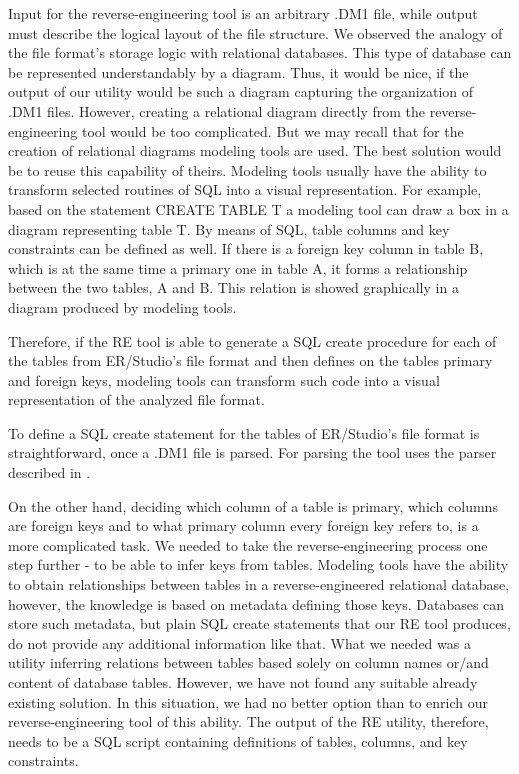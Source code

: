 Input for the reverse-engineering tool is an arbitrary .DM1 file, while output must describe the logical layout of the file structure.
We observed the analogy of the file format's storage logic with relational databases. 
This type of database can be represented understandably by a diagram.
Thus, it would be nice, if the output of our utility would be such a diagram capturing the organization of .DM1 files.
However, creating a relational diagram directly from the reverse-engineering tool would be too complicated. But we may recall that for the creation of relational diagrams modeling tools are used. The best solution would be to reuse this capability of theirs.
Modeling tools usually have the ability to transform selected routines of SQL into a visual representation.
For example, based on the statement CREATE TABLE T a modeling tool can draw a box in a diagram representing table T. 
By means of SQL, table columns and key constraints can be defined as well.
If there is a foreign key column in table B, which is at the same time a primary one in table A, it forms a relationship between the two tables, A and B. This relation is showed graphically in a diagram produced by modeling tools.

Therefore, if the RE tool is able to generate a SQL create procedure for each of the tables from ER/Studio's file format and then defines on the tables primary and foreign keys, modeling tools can transform such code into a visual representation of the analyzed file format.

To define a SQL create statement for the tables of ER/Studio's file format is straightforward, once a .DM1 file is parsed. For parsing the tool uses the parser described in .

On the other hand, deciding which column of a table is primary, which columns are foreign keys and to what primary column every foreign key refers to, is a more complicated task.
We needed to take the reverse-engineering process one step further - to be able to infer keys from tables.
Modeling tools have the ability to obtain relationships between tables in a reverse-engineered relational database, however, the knowledge is based on metadata defining those keys. Databases can store such metadata, but plain SQL create statements that our RE tool produces, do not provide any additional information like that.
What we needed was a utility inferring relations between tables based solely on column names or/and content of database tables. However, we have not found any suitable already existing solution.
In this situation, we had no better option than to enrich our reverse-engineering tool of this ability.
The output of the RE utility, therefore, needs to be a SQL script containing definitions of tables, columns, and key constraints.

